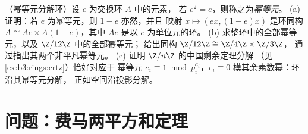 \begin{exercise}[$\star\star$]\label{exo:b3:rings:12}
（幂等元分解环）设 $e$ 为交换环 $A$ 中的元素，
若 $e^2 = e$，则称之为\emph{幂等元}。
(a) 证明：若 $e$ 为幂等元，则 $1 - e$ 亦然，并且
映射 $x \mapsto (ex, (1-e)x)$ 是环同构 $A
\cong Ae \times A(1-e)$，其中 $Ae$ 是以 $e$ 为单位元的环。
(b) 求整环中的全部幂等元，以及 $\Z/12\Z$ 中的全部幂等元；
给出同构 $\Z/12\Z \cong \Z/4\Z \times \Z/3\Z$，
通过指出其两个非平凡幂等元。
(c) 证明 $\Z/n\Z$ 的中国剩余定理分解
（见\cref{ex:b3:rings:crtz}）恰好对应于
幂等元 $e_i \equiv 1 \bmod p_i^{a_i}$，$e_i \equiv 0$
模其余素数幂：环沿其幂等元分解，
正如空间沿投影分解。
\end{exercise}

\section{问题：费马两平方和定理}

